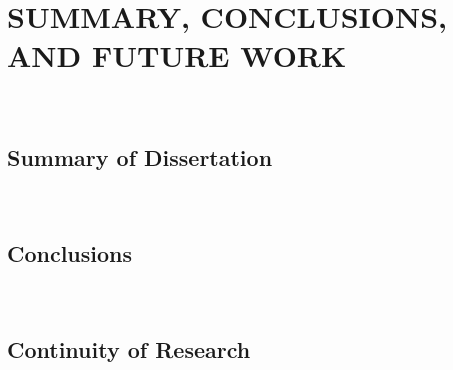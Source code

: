 \chapter{\uppercase{Summary, Conclusions, and Future Work} \label{chapter:06}}

\
\section{Summary of Dissertation}

\
\section{Conclusions}

\
\section{Continuity of Research}

